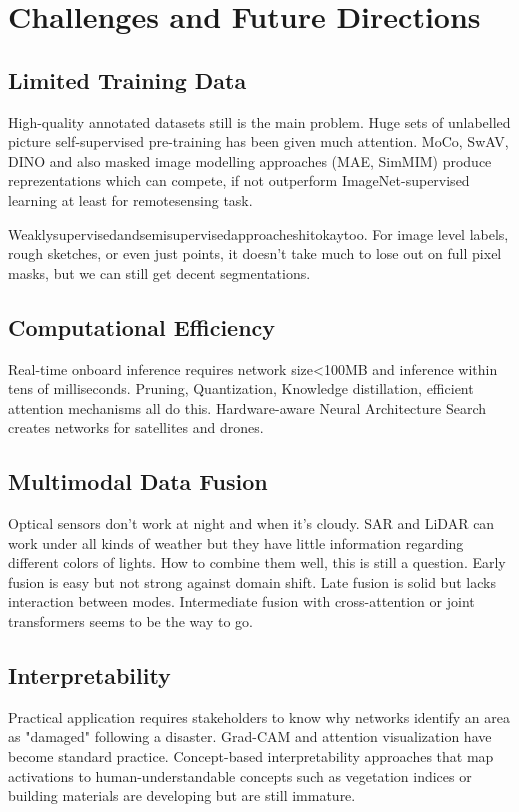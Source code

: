 \documentclass[12pt,a4paper]{article}
\begin{document}
\section{Challenges and Future Directions}
\label{sec:challenges}
\subsection{Limited Training Data}
High-quality annotated datasets still is the main problem. Huge sets of unlabelled picture self-supervised pre-training has been given much attention. MoCo, SwAV, DINO and also masked image modelling approaches (MAE, SimMIM) produce reprezentations which can compete, if not outperform ImageNet-supervised learning at least for remotesensing task.

Weaklysupervisedandsemisupervisedapproacheshitokaytoo. For image level labels, rough sketches, or even just points, it doesn’t take much to lose out on full pixel masks, but we can still get decent segmentations.

\subsection{Computational Efficiency}
Real-time onboard inference requires network size<100MB and inference within tens of milliseconds. Pruning, Quantization, Knowledge distillation, efficient attention mechanisms all do this. Hardware-aware Neural Architecture Search creates networks for satellites and drones.

\subsection{Multimodal Data Fusion}
Optical sensors don’t work at night and when it’s cloudy. SAR and LiDAR can work under all kinds of weather but they have little information regarding different colors of lights. How to combine them well, this is still a question. Early fusion is easy but not strong against domain shift. Late fusion is solid but lacks interaction between modes. Intermediate fusion with cross-attention or joint transformers seems to be the way to go.

\subsection{Interpretability}
Practical application requires stakeholders to know why networks identify an area as "damaged" following a disaster. Grad-CAM and attention visualization have become standard practice. Concept-based interpretability approaches that map activations to human-understandable concepts such as vegetation indices or building materials are developing but are still immature.
\end{document}
